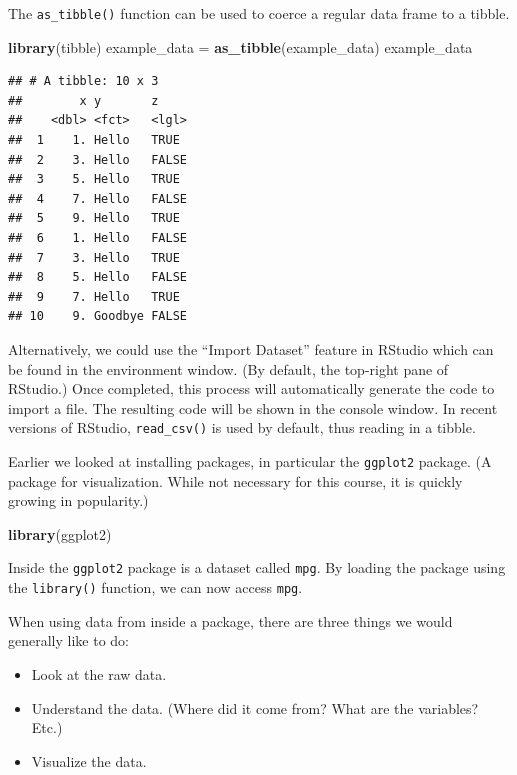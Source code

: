 \documentclass[]{book}
\newenvironment{Shaded}{\begin{snugshade}}{\end{snugshade}}
\newcommand{\KeywordTok}[1]{\textcolor[rgb]{0.13,0.29,0.53}{\textbf{#1}}}
\newcommand{\StringTok}[1]{\textcolor[rgb]{0.31,0.60,0.02}{#1}}
\newcommand{\NormalTok}[1]{#1}
\providecommand{\tightlist}{%
  \setlength{\itemsep}{0pt}\setlength{\parskip}{0pt}}
\theoremstyle{definition}
\theoremstyle{definition}
\theoremstyle{definition}
\theoremstyle{remark}
\begin{document}
The \texttt{as\_tibble()} function can be used to coerce a regular data
frame to a tibble.

\begin{Shaded}
\begin{Highlighting}[]
\KeywordTok{library}\NormalTok{(tibble)}
\NormalTok{example_data =}\StringTok{ }\KeywordTok{as_tibble}\NormalTok{(example_data)}
\NormalTok{example_data}
\end{Highlighting}
\end{Shaded}

\begin{verbatim}
## # A tibble: 10 x 3
##        x y       z    
##    <dbl> <fct>   <lgl>
##  1    1. Hello   TRUE 
##  2    3. Hello   FALSE
##  3    5. Hello   TRUE 
##  4    7. Hello   FALSE
##  5    9. Hello   TRUE 
##  6    1. Hello   FALSE
##  7    3. Hello   TRUE 
##  8    5. Hello   FALSE
##  9    7. Hello   TRUE 
## 10    9. Goodbye FALSE
\end{verbatim}

Alternatively, we could use the ``Import Dataset'' feature in RStudio
which can be found in the environment window. (By default, the top-right
pane of RStudio.) Once completed, this process will automatically
generate the code to import a file. The resulting code will be shown in
the console window. In recent versions of RStudio, \texttt{read\_csv()}
is used by default, thus reading in a tibble.

Earlier we looked at installing packages, in particular the
\texttt{ggplot2} package. (A package for visualization. While not
necessary for this course, it is quickly growing in popularity.)

\begin{Shaded}
\begin{Highlighting}[]
\KeywordTok{library}\NormalTok{(ggplot2)}
\end{Highlighting}
\end{Shaded}

Inside the \texttt{ggplot2} package is a dataset called \texttt{mpg}. By
loading the package using the \texttt{library()} function, we can now
access \texttt{mpg}.

When using data from inside a package, there are three things we would
generally like to do:

\begin{itemize}
\tightlist
\item
  Look at the raw data.
\item
  Understand the data. (Where did it come from? What are the variables?
  Etc.)
\item
  Visualize the data.
\end{itemize}
\end{document}
